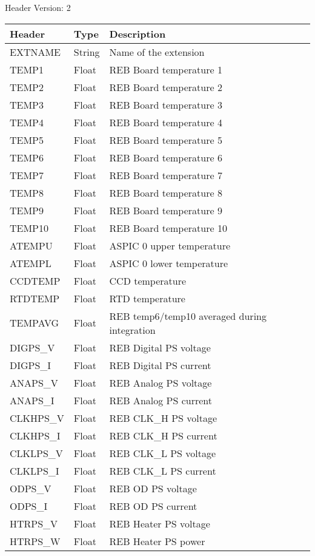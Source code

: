 Header Version: 2


\begin{longtable}{l l l l l}

\hline
Header & Type & Description \\
\hline
EXTNAME & String & Name of the extension \\
TEMP1 & Float & REB Board temperature 1 \\
TEMP2 & Float & REB Board temperature 2 \\
TEMP3 & Float & REB Board temperature 3 \\
TEMP4 & Float & REB Board temperature 4 \\
TEMP5 & Float & REB Board temperature 5 \\
TEMP6 & Float & REB Board temperature 6 \\
TEMP7 & Float & REB Board temperature 7 \\
TEMP8 & Float & REB Board temperature 8 \\
TEMP9 & Float & REB Board temperature 9 \\
TEMP10 & Float & REB Board temperature 10 \\
ATEMPU & Float & ASPIC 0 upper temperature \\
ATEMPL & Float & ASPIC 0 lower temperature \\
CCDTEMP & Float & CCD temperature \\
RTDTEMP & Float & RTD temperature \\
TEMPAVG & Float & REB temp6/temp10 averaged during integration \\
DIGPS\_V & Float & REB Digital PS voltage  \\
DIGPS\_I & Float & REB Digital PS current  \\
ANAPS\_V & Float & REB Analog PS voltage  \\
ANAPS\_I & Float & REB Analog PS current  \\
CLKHPS\_V & Float & REB CLK\_H PS voltage  \\
CLKHPS\_I & Float & REB CLK\_H PS current  \\
CLKLPS\_V & Float & REB CLK\_L PS voltage  \\
CLKLPS\_I & Float & REB CLK\_L PS current  \\
ODPS\_V & Float & REB OD PS voltage  \\
ODPS\_I & Float & REB OD PS current  \\
HTRPS\_V & Float & REB Heater PS voltage  \\
HTRPS\_W & Float & REB Heater PS power  \\

\end{longtable}
